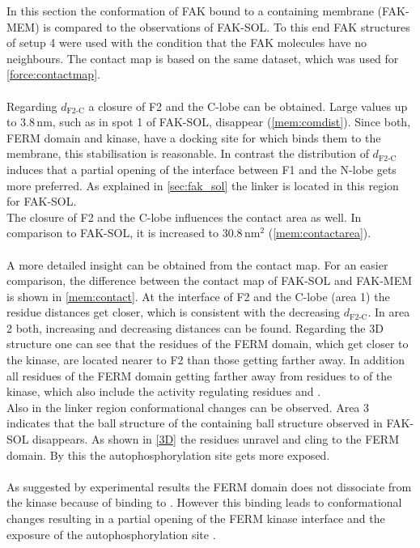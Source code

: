 In this section the conformation of FAK bound to a \pip{} containing membrane (FAK-MEM) is compared to the observations of FAK-SOL. To this end FAK structures of setup 4 were used with the condition that the FAK molecules have no neighbours. The contact map is based on the same dataset, which was used for \autoref{force:contactmap}.\\
\\
Regarding $d_\text{F2-C}$ a closure of F2 and the C-lobe can be obtained. Large values up to $3.8\,\si{\nano\metre}$, such as in spot 1 of FAK-SOL, disappear (\autoref{mem:comdist}). Since both, FERM domain and kinase, have a docking site for \pip{} which binds them to the membrane, this stabilisation is reasonable. In contrast the distribution of $d_\text{F2-C}$ induces that a partial opening of the interface between F1 and the N-lobe gets more preferred. As explained in \autoref{sec:fak_sol} the linker is located in this region for FAK-SOL.\\
The closure of F2 and the C-lobe influences the contact area as well. In comparison to FAK-SOL, it is increased to $30.8\,\si{\nano\metre}^2$ (\autoref{mem:contactarea}).\\
\\
A more detailed insight can be obtained from the contact map. For an easier comparison, the difference between the contact map of FAK-SOL and FAK-MEM is shown in \autoref{mem:contact}. At the interface of F2 and the C-lobe (area 1) the residue distances get closer, which is consistent with the decreasing $d_\text{F2-C}$. In area 2 both, increasing and decreasing distances can be found. Regarding the 3D structure one can see that the residues of the FERM domain, which get closer to the kinase, are located nearer to F2 than those getting farther away. In addition all residues of the FERM domain getting farther away from residues  to  of the kinase, which also include the activity regulating residues  and .\\
Also in the linker region conformational changes can be observed. Area 3 indicates that the ball structure of the  containing ball structure observed in FAK-SOL disappears. As shown in \autoref{3D} the residues unravel and cling to the FERM domain. By this the autophosphorylation site  gets more exposed.\\
\\
As suggested by experimental results the FERM domain does not dissociate from the kinase because of binding to \pip{}. However this binding leads to conformational changes resulting in a partial opening of the FERM kinase interface and the exposure of the autophosphorylation site  \autocites{pap001}{pap003}.
